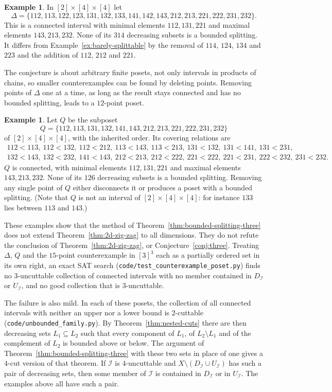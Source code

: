 \documentclass[10pt, a4paper]{article}
\theoremstyle{plain}
\theoremstyle{definition}
\newtheorem{example}[theorem]{Example}
\newcommand{\I}{\mathcal{I}}
\begin{document}
\begin{example}\label{ex:no-bounded-splitting}
  In $[2]\times[4]\times[4]$ let
  \[
    \Delta=\{112,113,122,123,131,132,133,141,142,143,212,213,221,222,231,232\}.
  \]
  This is a connected interval with minimal elements $112,131,221$ and maximal elements
  $143,213,232$. None of its $314$ decreasing subsets is a bounded splitting. It differs
  from Example~\ref{ex:barely-splittable} by the removal of $114$, $124$, $134$ and
  $223$ and the addition of $112$, $212$ and $221$.
\end{example}

The conjecture is about arbitrary finite posets, not only intervals in products of
chains, so smaller counterexamples can be found by deleting points. Removing points
of $\Delta$ one at a time, as long as the result stays connected and has no bounded
splitting, leads to a $12$-point poset.

\begin{example}\label{ex:Q}
  Let $Q$ be the subposet
  \[
    Q=\{112,113,131,132,141,143,212,213,221,222,231,232\}
  \]
  of $[2]\times[4]\times[4]$, with the inherited order. Its covering relations are
  \begin{gather*}
    112<113,\ 112<132,\ 112<212,\ 113<143,\ 113<213,\ 131<132,\ 131<141,\ 131<231,\\
    132<143,\ 132<232,\ 141<143,\ 212<213,\ 212<222,\ 221<222,\ 221<231,\ 222<232,\
    231<232.
  \end{gather*}
  $Q$ is connected, with minimal elements $112,131,221$ and maximal elements
  $143,213,232$. None of its $126$ decreasing subsets is a bounded splitting. Removing
  any single point of $Q$ either disconnects it or produces a poset with a bounded
  splitting. (Note that $Q$ is not an interval of $[2]\times[4]\times[4]$: for instance
  $133$ lies between $113$ and $143$.)
\end{example}

These examples show that the method of Theorem~\ref{thm:bounded-splitting-three} does
not extend Theorem~\ref{thm:2d-zig-zag} to all dimensions. They do not refute
the conclusion of Theorem~\ref{thm:2d-zig-zag}, or Conjecture~\ref{conj:three}. Treating
$\Delta$, $Q$ and the $15$-point counterexample in $[3]^3$ each as a partially ordered
set in its own right, an exact SAT search (\texttt{code/test\_counterexample\_poset.py})
finds no $3$-uncuttable collection of connected intervals with no member contained in
$D_\I$ or $U_\I$, and no good collection that is $3$-uncuttable.

The failure is also mild. In each of these posets, the collection of all connected
intervals with neither an upper nor a lower bound is $2$-cuttable
(\texttt{code/unbounded\_family.py}). By Theorem~\ref{thm:nested-cuts} there are then
decreasing sets $L_1\subseteq L_2$ such that every component of $L_1$, of
$L_2\setminus L_1$ and of the complement of $L_2$ is bounded above or below. The
argument of Theorem~\ref{thm:bounded-splitting-three} with these two sets in place of
one gives a $4$-cut version of that theorem. If $\I$ is $4$-uncuttable and
$X\setminus(D_\I\cup U_\I)$ has such a pair of decreasing sets, then some member of
$\I$ is contained in $D_\I$ or in $U_\I$. The examples above all have such a pair.
\end{document}
